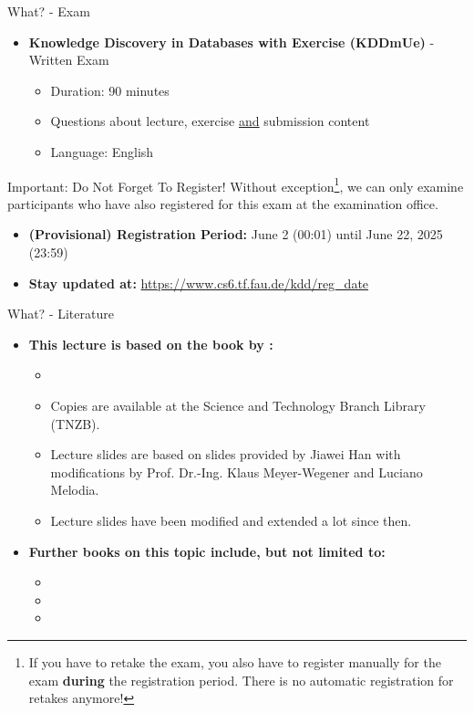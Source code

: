 \begin{frame}{What? - Exam}
	\begin{itemize}
		\item \textbf{Knowledge Discovery in Databases with Exercise (KDDmUe)} - {\color{faugray}Written Exam}
		      \begin{itemize}
			      \item Duration: 90 minutes
			      \item Questions about lecture, exercise \underline{and} submission content
			      \item Language: English
		      \end{itemize}
	\end{itemize}
	\begin{alertblock}{Important: Do Not Forget To Register!}
		Without exception\footnote{If you have to retake the exam, you also have to register manually for the exam \textbf{during} the registration period. There is no automatic registration for retakes anymore!}, we can only examine participants who have also registered for this exam at the examination office.

		\begin{itemize}
			\item \textbf{(Provisional) Registration Period:} June 2 (00:01) until June 22, 2025 (23:59)
			\item \textbf{Stay updated at:} \url{https://www.cs6.tf.fau.de/kdd/reg_date}
		\end{itemize}
	\end{alertblock}
\end{frame}

\begin{frame}{What? - Literature}
	\begin{itemize}
		\item \textbf{This lecture is based on the book by \citeauthor{han2011}:}
		      \begin{itemize}
			      \item {}
			      \item {\color{faugray}Copies are available at the Science and Technology Branch Library (TNZB).}
			      \item Lecture slides are based on slides provided by Jiawei Han with modifications by Prof. Dr.-Ing. Klaus Meyer-Wegener and Luciano Melodia.
			      \item Lecture slides have been modified and extended a lot since then.
		      \end{itemize}
		\item \textbf{Further books on this topic include, but not limited to:}
		      \begin{itemize}
			      \item {}
			      \item {}
			      \item {}
		      \end{itemize}
	\end{itemize}
\end{frame}

